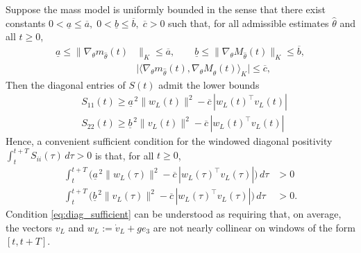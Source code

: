 \documentclass[letterpaper, 10 pt, conference]{ieeeconf}  %
\begin{document}
Suppose the mass model is uniformly bounded in the sense that there exist constants
\(
0<\underline a\le \overline a,\;
0<\underline b\le \overline b,\;
\overline c>0
\)
such that, for all admissible estimates $\hat\theta$ and all $t\ge 0$,
\begin{equation}\label{eq:grad_bounds}
\begin{split}
    \underline a \le \|\nabla_\theta m_{\hat\theta}(t)&\|_{K} \le \overline a,
\qquad
\underline b \le \|\nabla_\theta M_{\hat\theta}(t)\|_{K} \le \overline b, \\
&\big|\langle \nabla_\theta m_{\hat\theta}(t),\nabla_\theta M_{\hat\theta}(t)\rangle_{K}\big|\le \overline c,
\end{split}
\end{equation}
Then the diagonal entries of $S(t)$ admit the lower bounds
\begin{equation}\label{eq:Sdiag_lower}
\begin{split}
  &S_{11}(t)\ge \underline a^{\,2}\|w_L(t)\|^2-\overline c\,|w_L(t)^\top v_L(t)| \\ 
&S_{22}(t)\ge \underline b^{\,2}\|v_L(t)\|^2-\overline c\,|w_L(t)^\top v_L(t)|
\end{split}
\end{equation}
Hence, a convenient sufficient condition for the windowed diagonal positivity
$\int_t^{t+T}S_{ii}(\tau)\,d\tau>0$ is that, for all $t\ge 0$,
\begin{equation}\label{eq:diag_sufficient}
\begin{split}
    \int_t^{t+T}\Big(\underline a^{\,2}\|w_L(\tau)\|^2-\overline c\,|w_L(\tau)^\top v_L(\tau)|\Big)\,d\tau &>0 \\
    \int_t^{t+T}\Big(\underline b^{\,2}\|v_L(\tau)\|^2-\overline c\,|w_L(\tau)^\top v_L(\tau)|\Big)\,d\tau &>0.
\end{split}
\end{equation}
Condition \eqref{eq:diag_sufficient} can be understood as requiring that, on average, the vectors
$v_L$ and $w_L:=\dot v_L+ge_3$ are not nearly collinear on windows of the form $[t,t+T]$.
\end{document}
